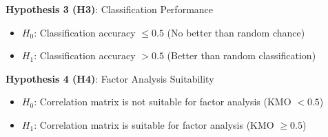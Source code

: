 \textbf{Hypothesis 3 (H3)}: Classification Performance
\begin{itemize}
	\item $H_0$: Classification accuracy $\leq 0.5$ (No better than random chance)
	\item $H_1$: Classification accuracy $> 0.5$ (Better than random classification)
\end{itemize}

\textbf{Hypothesis 4 (H4)}: Factor Analysis Suitability
\begin{itemize}
	\item $H_0$: Correlation matrix is not suitable for factor analysis (KMO $< 0.5$)
	\item $H_1$: Correlation matrix is suitable for factor analysis (KMO $\geq 0.5$)
\end{itemize}